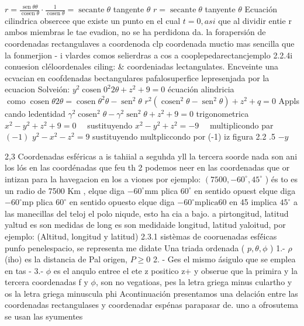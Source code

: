 $r=\frac{\operatorname{sen} \theta \theta}{\operatorname{cosen} \theta} \cdot \frac{1}{\operatorname{cosen} \theta}=\operatorname{secante} \theta$ tangente $\theta$
$r=\operatorname{secante} \theta$ tanyente $\theta$ Ecuación cilindrica
obsercee que existe un punto en el cual $t=0, a s i$ que al dividir entie r ambos miembras le tae evadion, no se ha perdidona da.
la forapersión de coordenadas rectangulaves a coordenoda clp coordenada muctio mas sencilla que la fonmerjion - i vlardes comos selierdras a cos a cooplepedarectancjemplo 2.2.4i conuesion cléloordenales ciling: \& coordeniadas lectangulates. Encveinte una ecvacian en coofdenadas bectangulares pafalosuperfice lepresenjada por la ecuacion
Solveión:
$y^2 \operatorname{cosen} 0^2 2 \theta+z^2+9=0$ écuación alindricia
$\operatorname{como} \operatorname{cosen} \theta 2 \theta=\operatorname{cosen} \theta^2 \theta-\operatorname{sen}^2 \theta$
$r^2\left(\operatorname{cosen}^2 \theta-\operatorname{sen}^2 \theta\right)+z^2+q=0$ Appls cando ledentidad
$\gamma^2 \operatorname{cosen}^2 \theta-\gamma^2 \operatorname{sen}^2 \theta+z^2+9=0$ trigonometrica
$x^2-y^2+z^2+9=0 \quad$ sustituyendo
$x^2-y^2+z^2=-9 \quad$ multiplicondo par $(-1)$
$y^2-x^2-z^2=9$
sustituyendo
multpliccondo por (-1)
iz figura 2.2 .5
$-y$




2,3 Coordenadas esféricas a is tahiial a seguhda yll la tercera soorde nada son ani los lós en las coordénadas que feu th
2 podemos neer en las coordenadas que or intizan
para la havegacion en los a viones por ejemplo: $\left(7500,-60^{\circ}, 45^{\circ}\right.$ ) és to es un radio de 7500 Km ,
elque diga $-60^{\circ} \mathrm{mm}$ plica $60^{\circ}$ en sentido opuest elque diga $-60^{\circ} \mathrm{mp}$ plica $60^{\circ}$ en sentido opuesto elque diga $-60^{\circ} \mathrm{mplica} 60$ en 45 implica $45^{\circ}$
a las manecillas del teloj el polo niqude, esto
ha cia a bajo. a pirtongitud, latitud yaltud
es son medidas de long es son medidaide longitud, latitud yaloitud, por ejemplo: (Altitud, longitud y latitud) 2.3.1 sistèmas de cooruenadas esfé́icas punfo penelespacio, se representa me didate Una triada ordenada ( $p, \theta, \phi$ )
1.- $\rho$ (iho) es la distancia de Pal origen, $P \geq 0$
2. - Ges el mismo ásigulo que se emplea en tas
-
3.- $\phi$ es el anqulo entree el ete z positico z+ y obserue que la primira y la tercera coordenadas f y $\phi$, son no vegatioas, pes la letra griega minus culartho y os la letra griega minuscula phi Acontinuación presentamos una delación entre las coordenadas rectangulases y coordenadar espénas parapasar de. uno a ofrosutema se usan las syumentes

